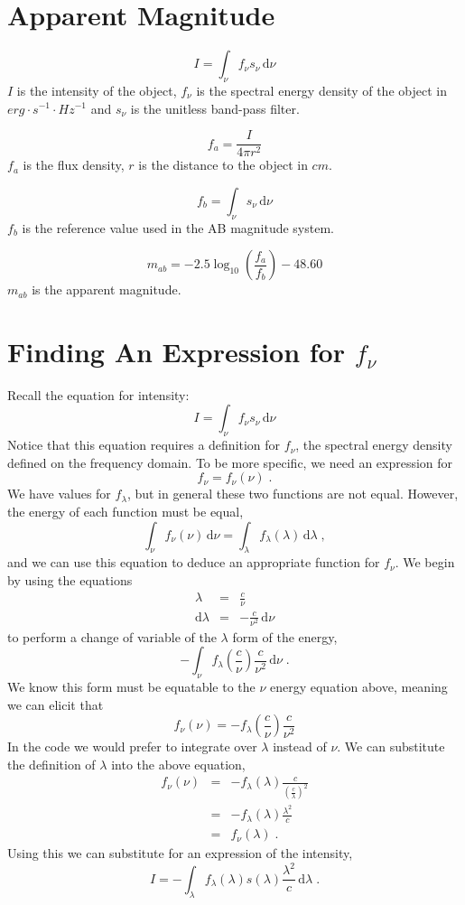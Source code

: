 \documentclass[12pt]{scrartcl}
\newcommand{\dx}[1]{\ensuremath{\,\mathrm{d}#1}}
\begin{document}
\maketitle

\section{Apparent Magnitude}

\[ I = \int_\nu f_\nu s_\nu \dx{\nu} \]
$I$ is the intensity of the object, $f_\nu$ is the spectral energy density of
the object in $erg\cdot s^{-1}\cdot Hz^{-1}$ and $s_\nu$ is the unitless band-pass filter.

\[ f_a = \frac{I}{4\pi r^2} \]
$f_a$ is the flux density, $r$ is the distance to the object in $cm$.

\[ f_b = \int_\nu s_\nu \dx{\nu} \]
$f_b$ is the reference value used in the AB magnitude system.

\[ m_{ab} = -2.5\log_{10}\left(\frac{f_a}{f_b}\right) - 48.60 \]
$m_{ab}$ is the apparent magnitude.

\section{Finding An Expression for $f_\nu$}

Recall the equation for intensity:
\[ I = \int_\nu f_\nu s_\nu \dx{\nu} \]
Notice that this equation requires a definition for $f_\nu$, the spectral
energy density defined on the frequency domain. To be more specific, we
need an expression for
\[ f_\nu = f_\nu(\nu) \;. \]
We have values for $f_\lambda$, but in general these two functions are
not equal. However, the energy of each function must be equal,
\[ \int_\nu f_\nu(\nu) \dx{\nu} = \int_\lambda f_\lambda(\lambda) \dx{\lambda} \;, \]
and we can use this equation to deduce an appropriate function for
$f_\nu$. We begin by using the equations
\begin{eqnarray*}
\lambda & = & \frac{c}{\nu} \\
\mathrm{d}{\lambda} & = & -\frac{c}{\nu^2}\dx{\nu}
\end{eqnarray*}
to perform a change of variable of the $\lambda$ form of the energy,
\[ -\int_\nu f_\lambda\left(\frac{c}{\nu}\right) \frac{c}{\nu^2} \dx{\nu} \; . \]
We know this form must be equatable to the $\nu$ energy equation
above, meaning we can elicit that
\[ f_\nu(\nu) = -f_\lambda\left(\frac{c}{\nu}\right) \frac{c}{\nu^2} \]
In the code we would prefer to integrate over $\lambda$ instead of $\nu$.
We can substitute the definition of $\lambda$ into the above equation,
\begin{eqnarray*}
f_\nu(\nu) & = & -f_\lambda(\lambda) \frac{c}{\left(\frac{c}{\lambda}\right)^2} \\
          & = & -f_\lambda(\lambda) \frac{\lambda^2}{c} \\
          & = & f_\nu(\lambda) \; .
\end{eqnarray*}
Using this we can substitute for an expression of
the intensity,
\[ I = -\int_\lambda f_\lambda(\lambda)s(\lambda)\frac{\lambda^2}{c}\dx{\lambda} \; . \]
\end{document}
